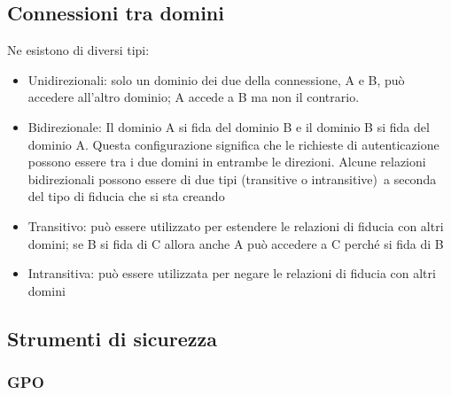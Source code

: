 \documentclass[
]{article}
\providecommand{\tightlist}{%
  \setlength{\itemsep}{0pt}\setlength{\parskip}{0pt}}
\begin{document}
\subsection{\texorpdfstring{{Connessioni tra
domini}}{Connessioni tra domini}}\label{h.j5z4w5uqkw1l}

{Ne esistono di diversi tipi:}

\begin{itemize}
\tightlist
\item
  {Unidirezionali}{: solo un dominio dei due della connessione, A e B,
  può accedere all'altro dominio; A accede a B ma non il contrario.}
\end{itemize}

{}

\begin{itemize}
\tightlist
\item
  {Bidirezionale}{: Il dominio A si fida del dominio B e il dominio B si
  fida del dominio A. Questa configurazione significa che le richieste
  di autenticazione possono essere tra i due domini in entrambe le
  direzioni. Alcune relazioni bidirezionali possono essere di due tipi
  (transitive }{o intransitive)}{~a seconda del tipo di fiducia che si
  sta creando }
\end{itemize}

{}

\begin{itemize}
\tightlist
\item
  {Transitivo}{: può essere utilizzato per estendere le relazioni di
  fiducia con altri domini; se B si fida di C allora anche A può
  accedere a C perché si fida di B }
\end{itemize}

{}

\begin{itemize}
\tightlist
\item
  {Intransitiva}{: può essere utilizzata per negare le relazioni di
  fiducia con altri domini}
\end{itemize}

\subsection{\texorpdfstring{{Strumenti di
sicurezza}}{Strumenti di sicurezza}}\label{h.luhz00iqftqx}

\subsubsection{\texorpdfstring{{GPO}}{GPO}}\label{h.6nl9uwg4kdp0}
\end{document}
